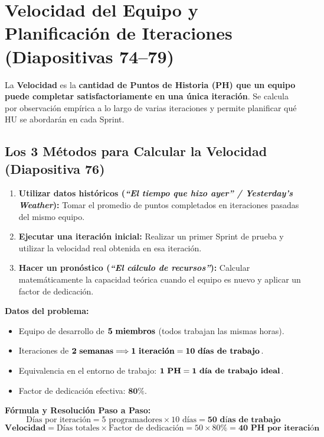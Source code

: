 \section{Velocidad del Equipo y Planificación de Iteraciones (Diapositivas 74--79)}

\begin{definicion}
La \textbf{Velocidad} es la \textbf{cantidad de Puntos de Historia (PH) que un equipo puede completar satisfactoriamente en una única iteración}. Se calcula por observación empírica a lo largo de varias iteraciones y permite planificar qué HU se abordarán en cada Sprint.
\end{definicion}

\subsection{Los 3 Métodos para Calcular la Velocidad (Diapositiva 76)}
\begin{enumerate}[label=\textbf{\arabic*.}, itemsep=2pt]
    \item \textbf{Utilizar datos históricos (\textit{``El tiempo que hizo ayer'' / Yesterday's Weather}):} Tomar el promedio de puntos completados en iteraciones pasadas del mismo equipo.
    \item \textbf{Ejecutar una iteración inicial:} Realizar un primer Sprint de prueba y utilizar la velocidad real obtenida en esa iteración.
    \item \textbf{Hacer un pronóstico (\textit{``El cálculo de recursos''}):} Calcular matemáticamente la capacidad teórica cuando el equipo es nuevo y aplicar un factor de dedicación.
\end{enumerate}

\begin{ejercicio}
\textbf{Datos del problema:}
\begin{itemize}[itemsep=1pt]
    \item Equipo de desarrollo de $\mathbf{5\text{ \textbf{miembros}}}$ (todos trabajan las mismas horas).
    \item Iteraciones de $\mathbf{2\text{ \textbf{semanas}}} \Longrightarrow \mathbf{1\text{ \textbf{iteración}} = 10\text{ \textbf{días de trabajo}}}$.
    \item Equivalencia en el entorno de trabajo: $\mathbf{1\text{ \textbf{PH}} = 1\text{ \textbf{día de trabajo ideal}}}$.
    \item Factor de dedicación efectiva: $\mathbf{80\%}$.
\end{itemize}

\textbf{Fórmula y Resolución Paso a Paso:}
$$\text{Días por iteración} = 5\text{ programadores} \times 10\text{ días} = \mathbf{50\text{ días de trabajo}}$$
$$\mathbf{Velocidad} = \text{Días totales} \times \text{Factor de dedicación} = 50 \times 80\% = \mathbf{40\text{ PH por iteración}}$$
\end{ejercicio}

